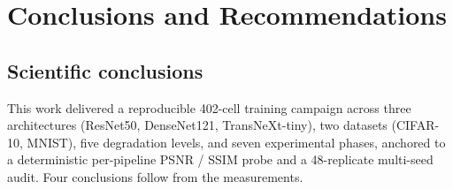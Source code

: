 \section{Conclusions and Recommendations}
\label{sec:conclusions}

\subsection{Scientific conclusions}
This work delivered a reproducible 402-cell training campaign across three
architectures (ResNet50, DenseNet121, TransNeXt-tiny), two datasets
(CIFAR-10, MNIST), five degradation levels, and seven experimental phases,
anchored to a deterministic per-pipeline PSNR / SSIM probe and a 48-replicate
multi-seed audit. Four conclusions follow from the measurements.

